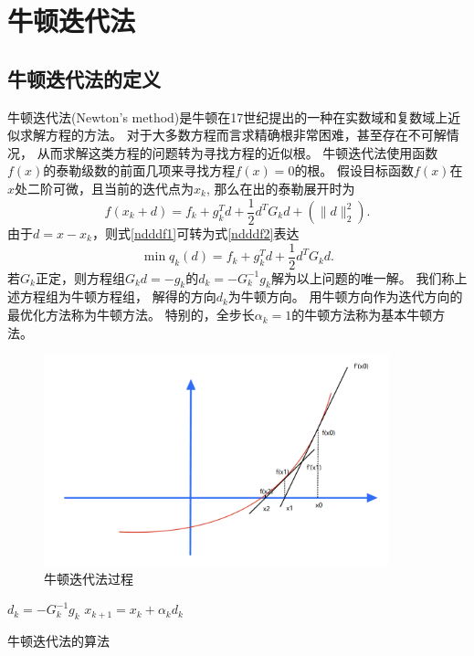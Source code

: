 \section{牛顿迭代法}
\subsection{牛顿迭代法的定义}
    牛顿迭代法(Newton's method)是牛顿在17世纪提出的一种在实数域和复数域上近似求解方程的方法。
    对于大多数方程而言求精确根非常困难，甚至存在不可解情况，
    从而求解这类方程的问题转为寻找方程的近似根。
    牛顿迭代法使用函数$f(x)$的泰勒级数的前面几项来寻找方程$f(x)=0$的根。
    假设目标函数$f(x)$在$x$处二阶可微，且当前的迭代点为$x_k$,
    那么在出的泰勒展开时为
    \begin{equation}
        f(x_k+d) = f_k + g_k^Td+\frac{1}{2}d^TG_kd + (\|d\|_2^2).
        \label{ndddf1}
    \end{equation}
    由于$d = x - x_k$，则式\ref{ndddf1}可转为式\ref{ndddf2}表达
    \begin{equation}
        \mathop{\mathrm{min}} q_k(d) = f_k + g_k^Td+\frac{1}{2}d^TG_kd.
        \label{ndddf2}
    \end{equation}
    若$G_k$正定，则方程组$G_kd=-g_k$的$d_k=-G_k^{-1}g_k$解为以上问题的唯一解。
    我们称上述方程组为牛顿方程组，
    解得的方向$d_k$为牛顿方向。
    用牛顿方向作为迭代方向的最优化方法称为牛顿方法。
    特别的，全步长$\alpha_k=1$的牛顿方法称为基本牛顿方法。
    \begin{figure}[hbtp]
        \centering
        \includegraphics[width=100mm]{./Figures/newton.png}
        \caption{牛顿迭代法过程}
    \end{figure}
    \begin{algorithm}
        \SetAlgoLined
         {
            $d_k=-G_k^{-1}g_k$
            $x_{k+1}=x_k+\alpha_kd_k$
        }
        \caption{牛顿迭代法的算法}
    \end{algorithm}

